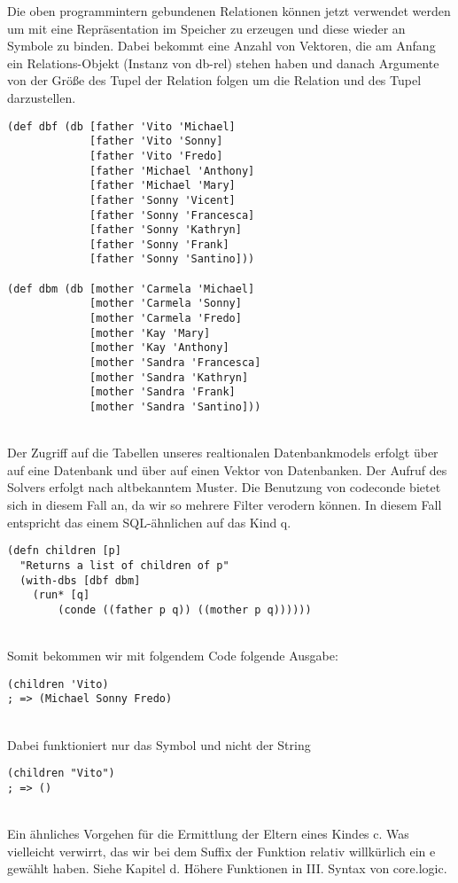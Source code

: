 Die oben programmintern gebundenen Relationen können jetzt verwendet werden um mit  eine Repräsentation im Speicher zu erzeugen und diese wieder an Symbole zu binden. Dabei bekommt  eine Anzahl von Vektoren, die am Anfang ein Relations-Objekt (\dq{}Instanz\dq{} von db-rel) stehen haben und danach Argumente von der Größe des Tupel der Relation folgen um die Relation und des Tupel darzustellen.

\begin{lstlisting}
(def dbf (db [father 'Vito 'Michael]
             [father 'Vito 'Sonny]
             [father 'Vito 'Fredo]
             [father 'Michael 'Anthony]
             [father 'Michael 'Mary]
             [father 'Sonny 'Vicent]
             [father 'Sonny 'Francesca]
             [father 'Sonny 'Kathryn]
             [father 'Sonny 'Frank]
             [father 'Sonny 'Santino]))
 
(def dbm (db [mother 'Carmela 'Michael]
             [mother 'Carmela 'Sonny]
             [mother 'Carmela 'Fredo]
             [mother 'Kay 'Mary]
             [mother 'Kay 'Anthony]
             [mother 'Sandra 'Francesca]
             [mother 'Sandra 'Kathryn]
             [mother 'Sandra 'Frank]
             [mother 'Sandra 'Santino]))
\end{lstlisting}
\\
Der Zugriff auf die Tabellen unseres realtionalen Datenbankmodels erfolgt über  auf eine Datenbank und über  auf einen Vektor von Datenbanken. Der Aufruf des Solvers erfolgt nach altbekanntem Muster. Die Benutzung von code{conde} bietet sich in diesem Fall an, da wir so mehrere Filter verodern können. In diesem Fall entspricht das einem SQL-ähnlichen  auf das Kind q.

\begin{lstlisting}
(defn children [p] 
  "Returns a list of children of p"
  (with-dbs [dbf dbm] 
	(run* [q] 
		(conde ((father p q)) ((mother p q))))))
\end{lstlisting}
\\
Somit bekommen wir mit folgendem Code folgende Ausgabe:

\begin{lstlisting}
(children 'Vito)
; => (Michael Sonny Fredo)
\end{lstlisting}
\\
Dabei funktioniert nur das Symbol  und nicht der String 

\begin{lstlisting}
(children "Vito")
; => ()
\end{lstlisting}
\\
Ein ähnliches Vorgehen für die Ermittlung der Eltern eines Kindes \dq{}c\dq{}. Was vielleicht verwirrt, das wir bei dem Suffix der Funktion relativ willkürlich ein e gewählt haben. Siehe Kapitel d. Höhere Funktionen in III. Syntax von core.logic.

